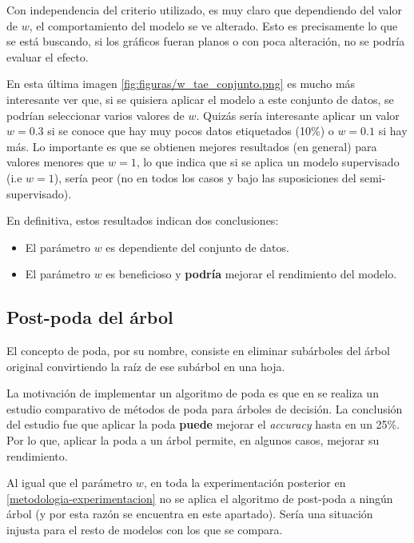 Con independencia del criterio utilizado, es muy claro que dependiendo del valor de $w$, el comportamiento del modelo se ve alterado. Esto es precisamente lo que se está buscando, si los gráficos fueran planos o con poca alteración, no se podría evaluar el efecto.


En esta última imagen \ref{fig:figuras/w_tae_conjunto.png} es mucho más interesante ver que, si se quisiera aplicar el modelo a este conjunto de datos, se podrían seleccionar varios valores de $w$. Quizás sería interesante aplicar un valor $w = 0.3$ si se conoce que hay muy pocos datos etiquetados (10\%) o $w = 0.1$ si hay más. Lo importante es que se obtienen mejores resultados (en general) para valores menores que $w = 1$, lo que indica que si se aplica un modelo supervisado (i.e $w = 1$), sería peor (no en todos los casos y bajo las suposiciones del semi-supervisado).

En definitiva, estos resultados indican dos conclusiones:

\begin{itemize}
    \item El parámetro $w$ es dependiente del conjunto de datos.
    \item El parámetro $w$ es beneficioso y \textbf{podría} mejorar el rendimiento del modelo.
\end{itemize}


\subsection{Post-poda del árbol}

El concepto de poda, por su nombre, consiste en eliminar subárboles del árbol original convirtiendo la raíz de ese subárbol en una hoja.

La motivación de implementar un algoritmo de poda es que en \cite{mingers1989empirical} se realiza un estudio comparativo de métodos de poda para árboles de decisión. La conclusión del estudio fue que aplicar la poda \textbf{puede} mejorar el \textit{accuracy} hasta en un 25\%. Por lo que, aplicar la poda a un árbol permite, en algunos casos, mejorar su rendimiento. 

Al igual que el parámetro $w$, en toda la experimentación posterior en \ref{metodologia-experimentacion} no se aplica el algoritmo de post-poda a ningún árbol (y por esta razón se encuentra en este apartado). Sería una situación injusta para el resto de modelos con los que se compara.

